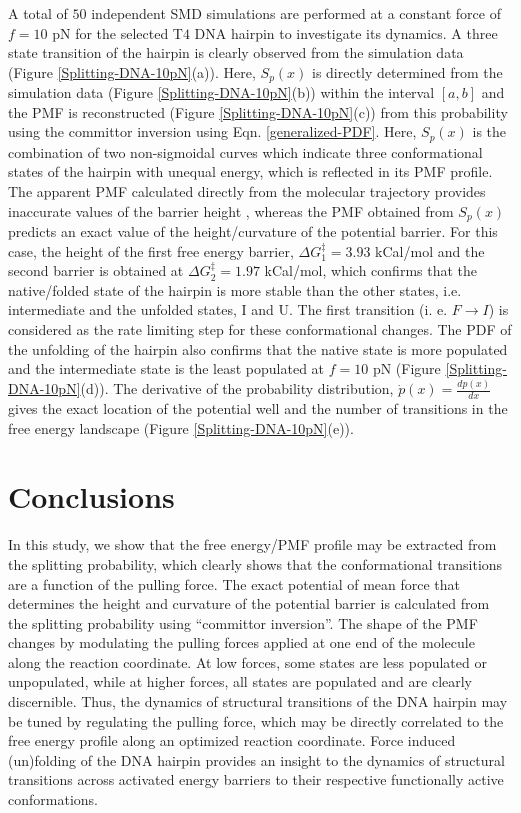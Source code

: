 \documentclass[twoside,twocolumn,9pt]{article}
\begin{document}
A total of $50$ independent SMD simulations are performed at a constant force of $f=10$ pN  
for the selected T$4$ DNA hairpin to investigate its dynamics.
A three state transition of the hairpin is clearly observed 
from the simulation data (Figure \ref{Splitting-DNA-10pN}(a)). Here, $S_{p}(x)$ is directly determined from 
the simulation data (Figure \ref{Splitting-DNA-10pN}(b)) within the interval $[a,b]$ and the PMF is reconstructed 
(Figure \ref{Splitting-DNA-10pN}(c)) from this probability using the committor inversion using 
Eqn. \ref{generalized-PDF}. 
Here, $S_{p}(x)$ is the combination of two non-sigmoidal curves which 
indicate three conformational states of the hairpin with unequal energy, which is reflected in its PMF profile. 
The apparent PMF calculated directly from the molecular trajectory provides inaccurate values of 
the barrier height \cite{makarov2021barrier,berezhkovskii2020nonequilibrium}, whereas the PMF obtained 
from $S_{p}(x)$ predicts an exact value of the height/curvature of the potential barrier. For this case, the 
height of the first free energy barrier, $\Delta G_1^\ddag=3.93$ kCal/mol and the second barrier is obtained at 
$\Delta G_2^\ddag=1.97$ kCal/mol, which confirms that the native/folded state of the hairpin is more stable 
than the other states, i.e. intermediate and the unfolded states, I and U. 
The first transition (i. e. ${F}\to{I}$) is considered as the rate limiting step for these conformational changes. 
The PDF of the unfolding of the hairpin
also confirms that the native state is more populated and the intermediate state is the least populated at $f=10$ pN 
(Figure \ref{Splitting-DNA-10pN}(d)). The derivative of the probability distribution, 
${\dot{p}(x)}=\frac{dp(x)}{dx}$ gives the exact location of the potential well and the number of transitions in the 
free energy landscape (Figure \ref{Splitting-DNA-10pN}(e)).

\section {Conclusions}

In this study, we show that the free energy/PMF profile may be extracted from the splitting probability,
which clearly shows that the conformational transitions are a function of the pulling force. 
The exact potential of mean force that determines the height and curvature of the potential barrier 
is calculated from the splitting probability using ``committor inversion''. The shape of the PMF changes 
by modulating the pulling forces applied at one end of the molecule along the reaction coordinate. 
At low forces, some states are less populated or unpopulated, while at higher forces, all states are 
populated and are clearly discernible. Thus, the dynamics of structural transitions of the DNA hairpin 
may be tuned by regulating the pulling force, which may be directly correlated to the free energy 
profile along an optimized reaction coordinate. Force induced (un)folding of the DNA hairpin provides 
an insight to the dynamics of structural transitions across activated energy barriers to their respective
functionally active conformations.
\end{document}
